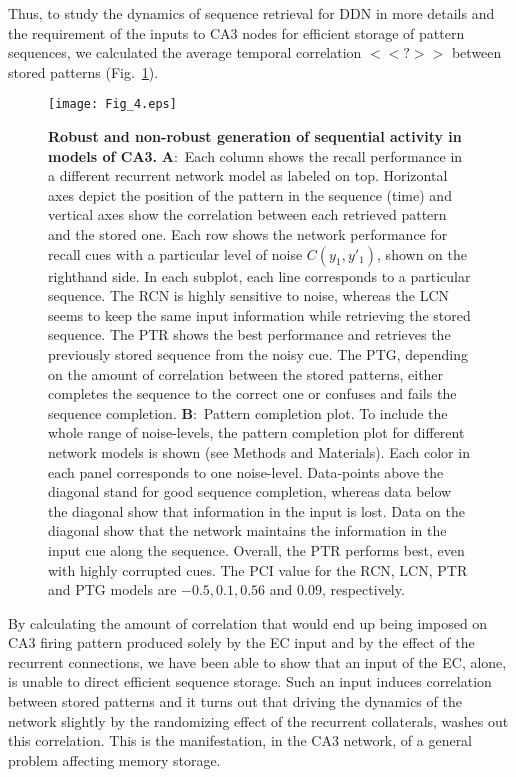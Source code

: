 \documentclass[utf8]{frontiersSCNS} %
\begin{document}
Thus, to study the dynamics of sequence retrieval for DDN in more details and the requirement of the inputs to CA3 nodes for efficient storage of pattern sequences, we calculated the average temporal correlation $ <<?>>$ between stored patterns (Fig.~\ref{Fig_4}).   


\begin{figure}[!htb]
\centering\texttt{[image: Fig\_4.eps]}
\caption{\textbf{Robust and non-robust generation of sequential activity in models of CA3.} \textbf{A}:~Each column shows the recall performance in a different recurrent network model as labeled on top. Horizontal axes depict the position of the pattern in the sequence (time) and vertical axes show the correlation between each retrieved pattern and the stored one. Each row shows the network performance for recall cues with a particular level of noise $C(y_{1}, y'_{1})$, shown on the righthand side. In each subplot, each line corresponds to a particular sequence. The RCN is highly sensitive to noise, whereas the LCN seems to keep the same input information while retrieving the stored sequence. The PTR shows the best performance and retrieves the previously stored sequence from the noisy cue. The PTG, depending on the amount of correlation between the stored patterns, either completes the sequence to the correct one or confuses and fails the sequence completion. \textbf{B}:~Pattern completion plot. To include the whole range of noise-levels, the pattern completion plot for different network models is shown (see Methods and Materials). Each color in each panel corresponds to one noise-level. Data-points above the diagonal stand for good sequence completion, whereas data below the diagonal show that information in the input is lost. Data on the diagonal show that the network maintains the information in the input cue along the sequence. Overall, the PTR performs best, even with highly corrupted cues. The PCI value for the RCN, LCN, PTR and PTG models are $-0.5, 0.1, 0.56$ and $0.09$, respectively.} 
\label{Fig_4}
\end{figure}





By calculating the amount of correlation that would end up being imposed on CA3 firing pattern produced solely by the EC input and by the effect of the recurrent connections, we have been able to show that an input of the EC, alone, is unable to direct efficient sequence storage. Such an input induces correlation between stored patterns and it turns out that driving the dynamics of the network slightly by the randomizing effect of the recurrent collaterals, washes out this correlation. This is the manifestation, in the CA3 network, of a general problem affecting memory storage. 
\end{document}
